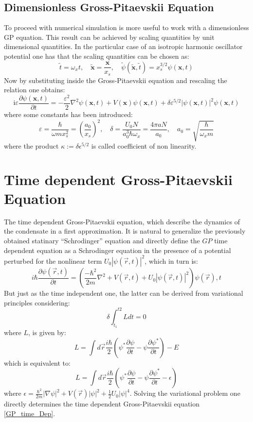\documentclass[a4paper,10pt]{article}
\begin{document}
\subsection{Dimensionless Gross-Pitaevskii Equation}
To proceed with numerical simulation is more useful to work with a dimensionless GP equation. This result can be achieved by scaling quantities by unit dimensional quantities. In the particular case of an isotropic harmonic oscillator potential one has that the scaling quantities can be chosen as:
\[
	\tilde{t}=\omega_{x} t, \quad \tilde{\mathbf{x}}=\frac{\mathbf{x}}{x_{s}}, \quad \tilde{\psi}(\tilde{\mathbf{x}}, \tilde{t})=x_{s}^{3 / 2} \psi(\mathbf{x}, t)
\]
Now by substituting inside the Gross-Pitaevskii equation and rescaling the relation one obtains:
\[
	\mathrm{i} \varepsilon \frac{\partial \psi(\mathbf{x}, t)}{\partial t}=-\frac{\varepsilon^{2}}{2} \nabla^{2} \psi(\mathbf{x}, t)+V(\mathbf{x}) \psi(\mathbf{x}, t)+\delta \varepsilon^{5 / 2}|\psi(\mathbf{x}, t)|^{2} \psi(\mathbf{x}, t)
\]
where some constants has been introduced:
\[
	\varepsilon=\frac{\hbar}{\omega m x_{s}^{2}}=\left(\frac{a_{0}}{x_{s}}\right)^{2}, \quad \delta=\frac{U_{0} N}{a_{0}^{3} \hbar \omega_{x}}=\frac{4 \pi a N}{a_{0}}, \quad a_{0}=\sqrt{\frac{\hbar}{\omega_{x} m}}
\]
where the product $\kappa := \delta \epsilon^{5/2}$ is called coefficient of non linearity.

\section{Time dependent Gross-Pitaevskii Equation}
The time dependent Gross-Pitaevskii equation, which describe the dynamics of the condensate in a first approximation. It is natural to generalize the previously obtained statinary ``Schrodinger'' equation and directly define the $GP$ time dependent equation as a Schrodinger equation in the presence of a potential perturbed for the nonlinear term $U_0|\psi(\vec{r},t)|^2$, which in turn is: 
\begin{equation}\label{GP_time_Dep}
 i\hbar \frac{\partial \psi(\vec{r},t)}{\partial t}=\left(\frac{-\hbar^2}{2m}\nabla^2 +V(\vec{r},t) +U_0 |\psi(\vec{r},t)|^2 \right)\psi(\vec{r}),t
\end{equation}
But just as the time independent one, the latter can be derived from variational principles considering:
\begin{equation}
 \delta \int_{t_1}^{t2}Ldt=0
 \end{equation}
 where $L$, is given by:
 \begin{equation}
  L=\int d\vec{r}\frac{i\hbar}{2}\left(\psi^*\frac{\partial \psi}{\partial t}-\psi \frac{\partial \psi^*}{\partial t}\right)-E
 \end{equation}
 which is equivalent to:
 \begin{equation}
  L=\int d\vec{r}\frac{i\hbar}{2}\left(\psi^*\frac{\partial \psi}{\partial t}-\psi \frac{\partial \psi^*}{\partial t}-\epsilon\right)
 \end{equation}
where $\epsilon=\frac{\hbar^2}{2m}|\nabla\psi|^2+V(\vec{r})|\psi|^2+\frac{1}{2}U_0|\psi|^4$. Solving the variational problem one directly determines the time dependent Gross-Pitaevskii equation \ref{GP_time_Dep}.
\end{document}
